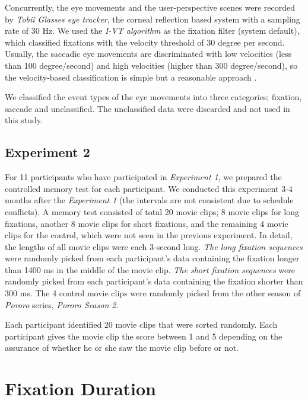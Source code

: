 \documentclass[oneside,master]{snueethesis}
\begin{document}
Concurrently, the eye movements and the user-perspective scenes were recorded by \textit{Tobii Glasses eye tracker}, the corneal reflection based system with a sampling rate of 30 Hz. We used the \textit{I-VT algorithm} as the fixation filter (system default), which classified fixations with the velocity threshold of 30 degree per second. Usually, the saccadic eye movements are discriminated with low velocities (less than 100 degree/second) and high velocities (higher than 300 degree/second), so the velocity-based classification is simple but a reasonable approach \cite{Salvucci2000}.

We classified the event types of the eye movements into three categories; fixation, saccade and unclassified. The unclassified data were discarded and not used in this study.


\section{Experiment 2}

For 11 participants who have participated in \textit{Experiment 1}, we prepared the controlled memory test for each participant. We conducted this experiment 3-4 months after the \textit{Experiment 1} (the intervals are not consistent due to schedule conflicts). A memory test consisted of total 20 movie clips; 8 movie clips for long fixations, another 8 movie clips for short fixations, and the remaining 4 movie clips for the control, which were not seen in the previous experiment. In detail, the lengths of all movie clips were each 3-second long. \textit{The long fixation sequences} were randomly picked from each participant's data containing the fixation longer than 1400 ms in the middle of the movie clip. \textit{The short fixation sequences} were randomly picked from each participant's data containing the fixation shorter than 300 ms. The 4 control movie clips were randomly picked from the other season of \textit{Pororo} series, \textit{Pororo Season 2}.

Each participant identified 20 movie clips that were sorted randomly. Each participant gives the movie clip the score between 1 and 5 depending on the assurance of whether he or she saw the movie clip before or not. 


\chapter{Fixation Duration}
\label{sec:fixation-duration}
\end{document}

